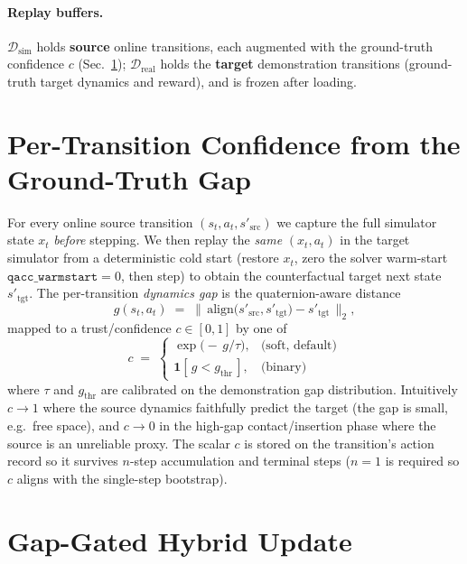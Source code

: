\documentclass[11pt]{article}
\newcommand{\Dsim}{\mathcal{D}_{\mathrm{sim}}}
\newcommand{\Dreal}{\mathcal{D}_{\mathrm{real}}}
\begin{document}
\paragraph{Replay buffers.}
$\Dsim$ holds \textbf{source} online transitions, each augmented with the
ground-truth confidence $c$ (Sec.~\ref{sec:gap}); $\Dreal$ holds the
\textbf{target} demonstration transitions (ground-truth target dynamics and
reward), and is frozen after loading.

\section{Per-Transition Confidence from the Ground-Truth Gap}
\label{sec:gap}

For every online source transition $(s_t,a_t,s'_{\mathrm{src}})$ we capture the
full simulator state $x_t$ \emph{before} stepping. We then replay the
\emph{same} $(x_t,a_t)$ in the target simulator from a deterministic cold start
(restore $x_t$, zero the solver warm-start $\texttt{qacc\_warmstart}{=}0$, then
step) to obtain the counterfactual target next state $s'_{\mathrm{tgt}}$. The
per-transition \emph{dynamics gap} is the quaternion-aware distance
\begin{equation}
  g(s_t,a_t)\;=\;\big\lVert\, \mathrm{align}\big(s'_{\mathrm{src}},
  s'_{\mathrm{tgt}}\big)-s'_{\mathrm{tgt}} \,\big\rVert_2 ,
\end{equation}
mapped to a trust/confidence $c\in[0,1]$ by one of
\begin{equation}
  c \;=\;
  \begin{cases}
    \exp\!\big(-\,g/\tau\big), & \text{(soft, default)}\\[2pt]
    \mathbf{1}\!\left[\,g < g_{\mathrm{thr}}\,\right], & \text{(binary)}
  \end{cases}
  \label{eq:c}
\end{equation}
where $\tau$ and $g_{\mathrm{thr}}$ are calibrated on the demonstration
gap distribution. Intuitively $c\!\to\!1$ where the source dynamics faithfully
predict the target (the gap is small, e.g.\ free space), and $c\!\to\!0$ in the
high-gap contact/insertion phase where the source is an unreliable proxy. The
scalar $c$ is stored on the transition's action record so it survives $n$-step
accumulation and terminal steps ($n{=}1$ is required so $c$ aligns with the
single-step bootstrap).

\section{Gap-Gated Hybrid Update}
\end{document}
